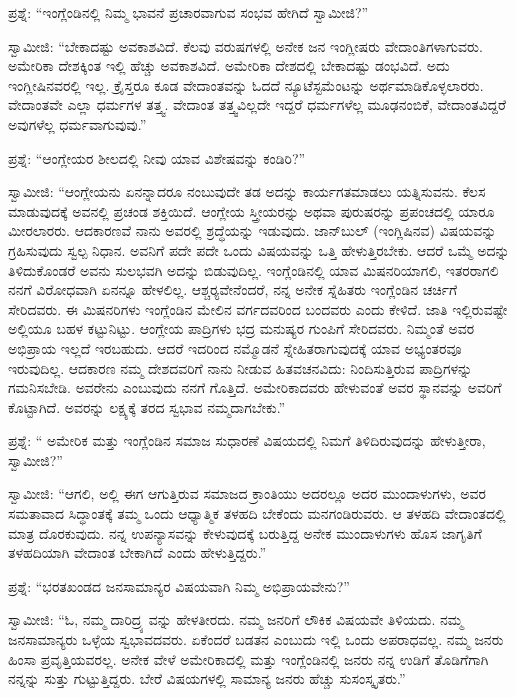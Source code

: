  ಪ್ರಶ್ನೆ: “ಇಂಗ್ಲೆಂಡಿನಲ್ಲಿ ನಿಮ್ಮ ಭಾವನೆ ಪ್ರಚಾರವಾಗುವ ಸಂಭವ ಹೇಗಿದೆ ಸ್ವಾಮೀಜಿ?” 

 ಸ್ವಾಮೀಜಿ: “ಬೇಕಾದಷ್ಟು ಅವಕಾಶವಿದೆ. ಕೆಲವು ವರುಷಗಳಲ್ಲಿ ಅನೇಕ ಜನ ಇಂಗ್ಲೀಷರು ವೇದಾಂತಿಗಳಾಗುವರು. ಅಮೇರಿಕಾ ದೇಶಕ್ಕಿಂತ ಇಲ್ಲಿ ಹೆಚ್ಚು ಅವಕಾಶವಿದೆ. ಅಮೇರಿಕಾ ದೇಶದಲ್ಲಿ ಬೇಕಾದಷ್ಟು ಡಂಭವಿದೆ. ಅದು ಇಂಗ್ಲೀಷಿನವರಲ್ಲಿ ಇಲ್ಲ. ಕ್ರೈಸ್ತರೂ ಕೂಡ ವೇದಾಂತವನ್ನು ಓದದೆ ನ್ಯೂಟೆಸ್ಟಮೆಂಟನ್ನು ಅರ್ಥಮಾಡಿಕೊಳ್ಳಲಾರರು. ವೇದಾಂತವೇ ಎಲ್ಲಾ ಧರ್ಮಗಳ ತತ್ತ್ವ. ವೇದಾಂತ ತತ್ತ್ವವಿಲ್ಲದೇ ಇದ್ದರೆ ಧರ್ಮಗಳೆಲ್ಲ ಮೂಢನಂಬಿಕೆ, ವೇದಾಂತವಿದ್ದರೆ ಅವುಗಳೆಲ್ಲ ಧರ್ಮವಾಗುವುವು.” 

 ಪ್ರಶ್ನೆ: “ಆಂಗ್ಲೇಯರ ಶೀಲದಲ್ಲಿ ನೀವು ಯಾವ ವಿಶೇಷವನ್ನು ಕಂಡಿರಿ?” 

 ಸ್ವಾಮೀಜಿ: “ಆಂಗ್ಲೇಯನು ಏನನ್ನಾದರೂ ನಂಬುವುದೇ ತಡ ಅದನ್ನು ಕಾರ್ಯಗತಮಾಡಲು ಯತ್ನಿಸುವನು. ಕೆಲಸ ಮಾಡುವುದಕ್ಕೆ ಅವನಲ್ಲಿ ಪ್ರಚಂಡ ಶಕ್ತಿಯಿದೆ. ಆಂಗ್ಲೇಯ ಸ್ತ್ರೀಯರನ್ನು ಅಥವಾ ಪುರುಷರನ್ನು ಪ್ರಪಂಚದಲ್ಲಿ ಯಾರೂ ಮೀರಲಾರರು. ಆದಕಾರಣವೆ ನಾನು ಅವರಲ್ಲಿ ಶ್ರದ್ಧೆಯನ್ನು ಇಡುವುದು. ಜಾನ್‌ಬುಲ್ (ಇಂಗ್ಲಿಷಿನವ) ವಿಷಯವನ್ನು ಗ್ರಹಿಸುವುದು ಸ್ವಲ್ಪ ನಿಧಾನ. ಅವನಿಗೆ ಪದೇ ಪದೇ ಒಂದು ವಿಷಯವನ್ನು ಒತ್ತಿ ಹೇಳುತ್ತಿರಬೇಕು. ಆದರೆ ಒಮ್ಮೆ ಅದನ್ನು ತಿಳಿದುಕೊಂಡರೆ ಅವನು ಸುಲಭವಗಿ ಅದನ್ನು ಬಿಡುವುದಿಲ್ಲ. ಇಂಗ್ಲೆಂಡಿನಲ್ಲಿ ಯಾವ ಮಿಷನರಿಯಾಗಲಿ, ಇತರರಾಗಲಿ ನನಗೆ ವಿರೋಧವಾಗಿ ಏನನ್ನೂ ಹೇಳಲಿಲ್ಲ. ಆಶ್ಚರ‍್ಯವೇನೆಂದರೆ, ನನ್ನ ಅನೇಕ ಸ್ನೆಹಿತರು ಇಂಗ್ಲೆಂಡಿನ ಚರ್ಚಿಗೆ ಸೇರಿದವರು. ಈ ಮಿಷನರಿಗಳು ಇಂಗ್ಲೆಂಡಿನ ಮೇಲಿನ ವರ್ಗದವರಿಂದ ಬಂದವರು ಎಂದು ಕೇಳಿದೆ. ಜಾತಿ ಇಲ್ಲಿರುವಷ್ಟೇ ಅಲ್ಲಿಯೂ ಬಹಳ ಕಟ್ಟುನಿಟ್ಟು. ಆಂಗ್ಲೇಯ ಪಾದ್ರಿಗಳು ಭದ್ರ ಮನುಷ್ಯರ ಗುಂಪಿಗೆ ಸೇರಿದವರು. ನಿಮ್ಮಂತೆ ಅವರ ಅಭಿಪ್ರಾಯ ಇಲ್ಲದೆ ಇರಬಹುದು. ಆದರೆ ಇದರಿಂದ ನಮ್ಮೊಡನೆ ಸ್ನೇಹಿತರಾಗುವುದಕ್ಕೆ ಯಾವ ಅಭ್ಯಂತರವೂ ಇರುವುದಿಲ್ಲ. ಆದಕಾರಣ ನಮ್ಮ ದೇಶದವರಿಗೆ ನಾನು ನೀಡುವ ಹಿತವಚನವಿದು: ನಿಂದಿಸುತ್ತಿರುವ ಪಾದ್ರಿಗಳನ್ನು ಗಮನಿಸಬೇಡಿ. ಅವರೇನು ಎಂಬುವುದು ನನಗೆ ಗೊತ್ತಿದೆ. ಅಮೇರಿಕಾದವರು ಹೇಳುವಂತೆ ಅವರ ಸ್ಥಾನವನ್ನು ಅವರಿಗೆ ಕೊಟ್ಟಾಗಿದೆ. ಅವರನ್ನು ಲಕ್ಷ್ಯಕ್ಕೆ ತರದ ಸ್ವಭಾವ ನಮ್ಮದಾಗಬೇಕು.” 

 ಪ್ರಶ್ನೆ: “ ಅಮೇರಿಕ ಮತ್ತು ಇಂಗ್ಲೆಂಡಿನ ಸಮಾಜ ಸುಧಾರಣೆ ವಿಷಯದಲ್ಲಿ ನಿಮಗೆ ತಿಳಿದಿರುವುದನ್ನು ಹೇಳುತ್ತೀರಾ, ಸ್ವಾಮೀಜಿ?” 

 ಸ್ವಾಮೀಜಿ: “ಆಗಲಿ, ಅಲ್ಲಿ ಈಗ ಆಗುತ್ತಿರುವ ಸಮಾಜದ ಕ್ರಾಂತಿಯು ಅದರಲ್ಲೂ ಅದರ ಮುಂದಾಳುಗಳು, ಅವರ ಸಮತಾವಾದ ಸಿದ್ಧಾಂತಕ್ಕೆ ತಮ್ಮ ಒಂದು ಆಧ್ಯಾತ್ಮಿಕ ತಳಹದಿ ಬೇಕೆಂದು ಮನಗಂಡಿರುವರು. ಆ ತಳಹದಿ ವೇದಾಂತದಲ್ಲಿ ಮಾತ್ರ ದೊರಕುವುದು. ನನ್ನ ಉಪನ್ಯಾಸವನ್ನು ಕೇಳುವುದಕ್ಕೆ ಬರುತ್ತಿದ್ದ ಅನೇಕ ಮುಂದಾಳುಗಳು ಹೊಸ ಜಾಗೃತಿಗೆ ತಳಹದಿಯಾಗಿ ವೇದಾಂತ ಬೇಕಾಗಿದೆ ಎಂದು ಹೇಳುತ್ತಿದ್ದರು.” 

 ಪ್ರಶ್ನೆ: “ಭರತಖಂಡದ ಜನಸಾಮಾನ್ಯರ ವಿಷಯವಾಗಿ ನಿಮ್ಮ ಅಭಿಪ್ರಾಯವೇನು?” 

 ಸ್ವಾಮೀಜಿ: “ಓ, ನಮ್ಮ ದಾರಿದ್ರ್ಯ ವನ್ನು ಹೇಳತೀರದು. ನಮ್ಮ ಜನರಿಗೆ ಲೌಕಿಕ ವಿಷಯವೇ ತಿಳಿಯದು. ನಮ್ಮ ಜನಸಾಮಾನ್ಯರು ಒಳ್ಳೆಯ ಸ್ವಭಾವದವರು. ಏಕೆಂದರೆ ಬಡತನ ಎಂಬುದು ಇಲ್ಲಿ ಒಂದು ಅಪರಾಧವಲ್ಲ. ನಮ್ಮ ಜನರು ಹಿಂಸಾ ಪ್ರವೃತ್ತಿಯವರಲ್ಲ. ಅನೇಕ ವೇಳೆ ಅಮೇರಿಕಾದಲ್ಲಿ ಮತ್ತು ಇಂಗ್ಲೆಂಡಿನಲ್ಲಿ ಜನರು ನನ್ನ ಉಡಿಗೆ ತೊಡಿಗೆಗಾಗಿ ನನ್ನನ್ನು ಸುತ್ತು ಗುಟ್ಟುತ್ತಿದ್ದರು. ಬೇರೆ ವಿಷಯಗಳಲ್ಲಿ ಸಾಮಾನ್ಯ ಜನರು ಹೆಚ್ಚು ಸುಸಂಸ್ಕೃತರು.” 

